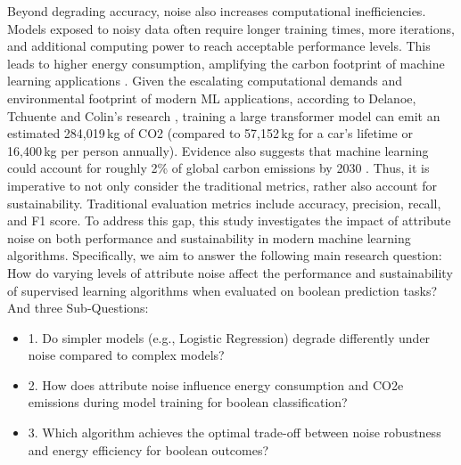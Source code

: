 \documentclass[conference]{IEEEtran}
\begin{document}
\newline
\newline
Beyond degrading accuracy, noise also increases computational inefficiencies. Models exposed to noisy data often require longer training times, more iterations, and additional computing power to reach acceptable performance levels. This leads to higher energy consumption, amplifying the carbon footprint of machine learning applications \cite{sciencedirect}.
\newline
\newline
Given the escalating computational demands and environmental footprint of modern ML applications, according to Delanoe, Tchuente and Colin’s research \cite{DELAN}, training a large transformer model can emit an estimated 284,019 kg of CO2 (compared to 57,152 kg for a car’s lifetime or 16,400 kg per person annually). Evidence also suggests that machine learning could account for roughly 2\% of global carbon emissions by 2030 \cite{carbon_emissions}.
Thus, it is imperative to not only consider the traditional metrics, rather also account for sustainability. Traditional evaluation metrics include accuracy, precision, recall, and F1 score.
\newline 
\newline
To address this gap, this study investigates the impact of attribute noise on both performance and sustainability in modern machine learning algorithms. Specifically, we aim to answer the following main research question:
How do varying levels of attribute noise affect the performance and sustainability of supervised learning algorithms when evaluated on boolean prediction tasks?
\newline
\newline
And three Sub-Questions:
\begin{itemize}
    \item 1. Do simpler models (e.g., Logistic Regression) degrade differently under noise compared to complex models?
    \item 2. How does attribute noise influence energy consumption and CO2e emissions during model training for boolean classification?
    \item 3. Which algorithm achieves the optimal trade-off between noise robustness and energy efficiency for boolean outcomes?
\end{itemize}
\newline 
\newline
\end{document}
